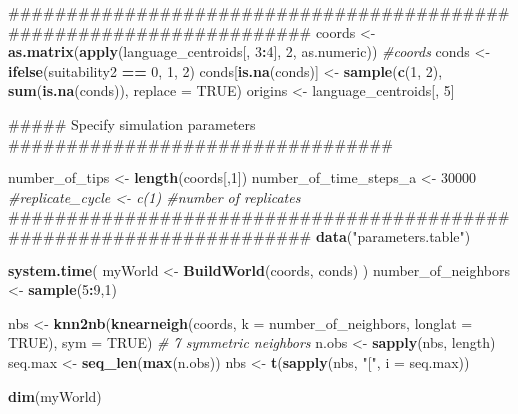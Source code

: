 \documentclass[]{book}
\newenvironment{Shaded}{\begin{snugshade}}{\end{snugshade}}
\newcommand{\KeywordTok}[1]{\textcolor[rgb]{0.13,0.29,0.53}{\textbf{{#1}}}}
\newcommand{\DataTypeTok}[1]{\textcolor[rgb]{0.13,0.29,0.53}{{#1}}}
\newcommand{\DecValTok}[1]{\textcolor[rgb]{0.00,0.00,0.81}{{#1}}}
\newcommand{\StringTok}[1]{\textcolor[rgb]{0.31,0.60,0.02}{{#1}}}
\newcommand{\CommentTok}[1]{\textcolor[rgb]{0.56,0.35,0.01}{\textit{{#1}}}}
\newcommand{\OtherTok}[1]{\textcolor[rgb]{0.56,0.35,0.01}{{#1}}}
\newcommand{\OperatorTok}[1]{\textcolor[rgb]{0.81,0.36,0.00}{\textbf{{#1}}}}
\newcommand{\NormalTok}[1]{{#1}}
\theoremstyle{definition}
\theoremstyle{definition}
\theoremstyle{definition}
\theoremstyle{remark}
\begin{document}
\begin{Shaded}
\begin{Highlighting}[]
{{\NormalTok{#####################################################################}
\NormalTok{coords <-}\StringTok{ }\KeywordTok{as.matrix}\NormalTok{(}\KeywordTok{apply}\NormalTok{(language_centroids[, }\DecValTok{3}\OperatorTok{:}\DecValTok{4}\NormalTok{], }\DecValTok{2}\NormalTok{, as.numeric)) }\CommentTok{#coords}
\NormalTok{conds <-}\StringTok{ }\KeywordTok{ifelse}\NormalTok{(suitability2 }\OperatorTok{==}\StringTok{ }\DecValTok{0}\NormalTok{, }\DecValTok{1}\NormalTok{, }\DecValTok{2}\NormalTok{)}
\NormalTok{conds[}\KeywordTok{is.na}\NormalTok{(conds)] <-}\StringTok{ }\KeywordTok{sample}\NormalTok{(}\KeywordTok{c}\NormalTok{(}\DecValTok{1}\NormalTok{, }\DecValTok{2}\NormalTok{), }\KeywordTok{sum}\NormalTok{(}\KeywordTok{is.na}\NormalTok{(conds)), }\DataTypeTok{replace =} \OtherTok{TRUE}\NormalTok{) }
\NormalTok{origins <-}\StringTok{ }\NormalTok{language_centroids[, }\DecValTok{5}\NormalTok{]}

\NormalTok{##### Specify simulation parameters #################################}

\NormalTok{number_of_tips <-}\StringTok{ }\KeywordTok{length}\NormalTok{(coords[,}\DecValTok{1}\NormalTok{])}
\NormalTok{number_of_time_steps_a <-}\StringTok{ }\DecValTok{30000}
\CommentTok{#replicate_cycle <- c(1)  #number of replicates}
\NormalTok{#####################################################################}
\KeywordTok{data}\NormalTok{(}\StringTok{"parameters.table"}\NormalTok{)}


\KeywordTok{system.time}\NormalTok{(}
\NormalTok{  myWorld <-}\StringTok{ }\KeywordTok{BuildWorld}\NormalTok{(coords, conds)}
\NormalTok{)}
\NormalTok{number_of_neighbors <-}\StringTok{ }\KeywordTok{sample}\NormalTok{(}\DecValTok{5}\OperatorTok{:}\DecValTok{9}\NormalTok{,}\DecValTok{1}\NormalTok{)}

\NormalTok{nbs <-}\StringTok{ }\KeywordTok{knn2nb}\NormalTok{(}\KeywordTok{knearneigh}\NormalTok{(coords, }\DataTypeTok{k =}\NormalTok{ number_of_neighbors, }\DataTypeTok{longlat =} \OtherTok{TRUE}\NormalTok{),}
              \DataTypeTok{sym =} \OtherTok{TRUE}\NormalTok{) }\CommentTok{# 7 symmetric neighbors}
\NormalTok{n.obs <-}\StringTok{ }\KeywordTok{sapply}\NormalTok{(nbs, length)}
\NormalTok{seq.max <-}\StringTok{ }\KeywordTok{seq_len}\NormalTok{(}\KeywordTok{max}\NormalTok{(n.obs))}
\NormalTok{nbs <-}\StringTok{ }\KeywordTok{t}\NormalTok{(}\KeywordTok{sapply}\NormalTok{(nbs, }\StringTok{"["}\NormalTok{, }\DataTypeTok{i =}\NormalTok{ seq.max))}

\KeywordTok{dim}\NormalTok{(myWorld)}


}}
\end{Highlighting}
\end{Shaded}
\end{document}
